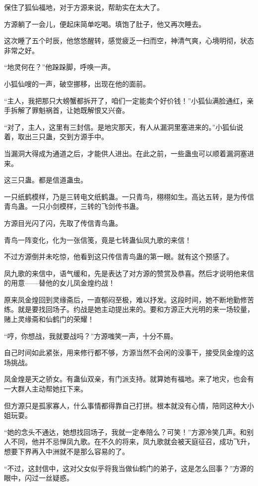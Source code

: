 \begin{this_body}
保住了狐仙福地，对于方源来说，帮助实在太大了。

方源躺了一会儿，便起床简单吃喝。填饱了肚子，他又再次睡去。

这次睡了五个时辰，他悠悠醒转，感觉疲乏一扫而空，神清气爽，心境明彻，状态非常之好。

“地灵何在？”他跺跺脚，呼唤一声。

小狐仙嗖的一声，破空挪移，出现在他的面前。

“主人，我把那只大螃蟹都拆开了，咱们一定能卖个好价钱！”小狐仙满脸通红，亲手拆解了罪魁祸首，让她既解恨又兴奋。

“对了，主人，这里有三封信。是地灾那天，有人从漏洞里塞进来的。”小狐仙说着，取出三只蛊，交到方源手中。

当漏洞大得成为通道之后，才能供人进出。在此之前，一些蛊虫可以顺着漏洞塞进来。

这三只蛊。都是信道蛊虫。

一只纸鹤模样，乃是三转电文纸鹤蛊。一只青鸟，栩栩如生。高达五转，是为传信青鸟蛊。一只小剑模样，三转的飞剑传书蛊。

方源目光闪了闪，先取了传信青鸟蛊。

青鸟一阵变化，化为一张信笺，竟是七转蛊仙凤九歌的来信！

不过方源倒并未吃惊，他看到这只传信青鸟蛊的第一眼。就有这个预感了。

凤九歌的来信中，语气缓和，先是表达了对方源的赞赏及恭喜。然后才说明他来信的用意——替他的女儿凤金煌约战！

原来凤金煌回到灵缘斋后，一直郁闷至极，难以抒发。这段时间，她不断地勤修苦练。就是要找回场子。约战是她主动提出来的。要和方源正大光明的来一场较量，赌上灵缘斋和仙鹤门的荣耀！

“哼，你想战，我就要战吗？”方源嗤笑一声，十分不屑。

自己时间如此紧张，用来修行都不够，方源当然不会闲的没事干，接受凤金煌的这场挑战。

凤金煌是天之骄女。有蛊仙双亲，有门派支持。就算她有福地。来了地灾，也会有一大群人主动帮她扛下来。

但方源只是孤家寡人，什么事情都得靠自己打拼。根本就没有心情，陪同这种大小姐玩耍。

“她的念头不通达，她想找回场子，我就一定奉陪么？可笑！”方源冷笑几声。和别人不同，他并不忌惮凤九歌。在不久的将来，凤九歌就会被天庭征召，成功飞升，想要下界再入中洲就不是那么容易的了。

“不过，这封信中，这对父女似乎将我当做仙鹤门的弟子，这是怎么回事？”方源的眼中，闪过一丝疑惑。


\end{this_body}
